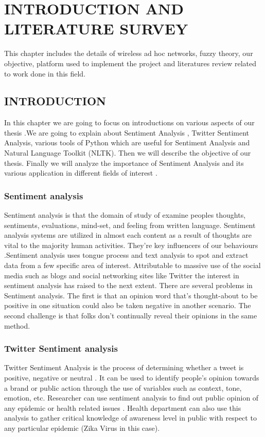 \chapter{INTRODUCTION AND LITERATURE SURVEY}
This chapter includes the details of wireless ad hoc networks, fuzzy theory, our objective, platform used to implement the
project and literatures review related to work done in this field.
\section{INTRODUCTION}
In this chapter we are going to focus on introductions on various aspects of our thesis .We are going to explain about Sentiment Analysis , Twitter Sentiment Analysis,  various tools of Python which are useful for Sentiment Analysis and Natural Language Toolkit (NLTK). Then we will describe the objective of our thesis.  Finally we will analyze the importance of Sentiment Analysis and its various application in different fields of interest .
\subsection{Sentiment analysis}
Sentiment analysis is that the domain of study of examine peoples thoughts, sentiments, evaluations, mind-set, and feeling from written language. Sentiment analysis systems are utilized in almost each content as a result of thoughts are vital to the majority human activities. They’re key influencers of our behaviours .Sentiment analysis uses tongue process and text analysis to spot and extract data from a few specific area of interest. Attributable to massive use of the social media such as blogs and social networking sites like Twitter the interest in sentiment analysis has raised to the next extent. There are several problems in Sentiment analysis. The first is that an opinion word that’s thought-about to be positive in one situation could also be taken negative in another scenario. The second challenge is that folks don’t continually reveal their opinions in the same method.
\subsection{Twitter Sentiment analysis}
Twitter Sentiment Analysis is the process of determining whether a tweet is positive, negative or neutral \cite{edtr1}. It can be used to identify people's opinion towards a brand or public action through the use of variables such as context, tone, emotion, etc. Researcher  can use sentiment analysis to find out public opinion of any epidemic or health related issues . Health department  can also use this analysis to gather critical knowledge of awareness level  in public with respect to any particular epidemic (Zika Virus in this case).
